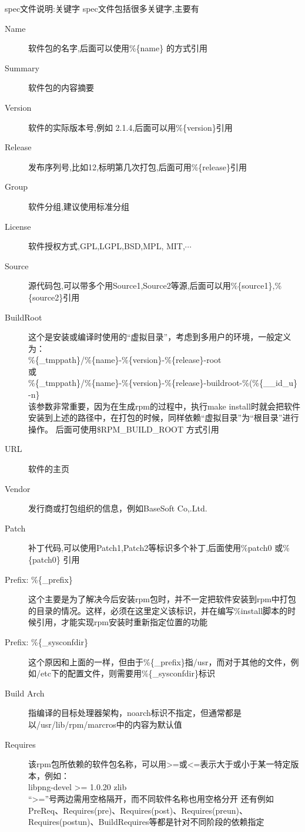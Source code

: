 \begin{frame}{spec文件说明:关键字}
spec文件包括很多关键字,主要有
\begin{description}
\item[Name] 软件包的名字,后面可以使用\%\{name\} 的方式引用
\item[Summary] 软件包的内容摘要
\item[Version] 软件的实际版本号,例如 2.1.4,后面可以用\%\{version\}引用
\item[Release] 发布序列号,比如12,标明第几次打包,后面可用\%\{release\}引用
\item[Group] 软件分组,建议使用标准分组
\item[License] 软件授权方式,GPL,LGPL,BSD,MPL, MIT,$\cdots$
\item[Source] 源代码包,可以带多个用Source1,Source2等源,后面可以用\%\{source1\},\%\{source2\}引用
\item[BuildRoot] 这个是安装或编译时使用的“虚拟目录”，考虑到多用户的环境，一般定义为：\\
\%\{\_tmppath\}/\%\{name\}-\%\{version\}-\%\{release\}-root \\
或 \\
\%\{\_tmppath\}/\%\{name\}-\%\{version\}-\%\{release\}-buildroot-\%(\%\{\_\_id\_u\} -n\} \\
该参数非常重要，因为在生成rpm的过程中，执行make install时就会把软件安装到上述的路径中，在打包的时候，同样依赖“虚拟目录”为“根目录”进行操作。
后面可使用\$RPM\_BUILD\_ROOT 方式引用
\item[URL] 软件的主页
\item[Vendor]发行商或打包组织的信息，例如BaseSoft Co,.Ltd.
\item[Patch] 补丁代码,可以使用Patch1,Patch2等标识多个补丁,后面使用\%patch0 或\%\{patch0\} 引用
\item[Prefix: \%\{\_prefix\}] 这个主要是为了解决今后安装rpm包时，并不一定把软件安装到rpm中打包的目录的情况。这样，必须在这里定义该标识，并在编写\%install脚本的时候引用，才能实现rpm安装时重新指定位置的功能
\item[Prefix: \%\{\_sysconfdir\}] 这个原因和上面的一样，但由于\%\{\_prefix\}指/usr，而对于其他的文件，例如/etc下的配置文件，则需要用\%\{\_sysconfdir\}标识
\item[Build Arch] 指编译的目标处理器架构，noarch标识不指定，但通常都是以/usr/lib/rpm/marcros中的内容为默认值

\item[Requires] 该rpm包所依赖的软件包名称，可以用>=或<=表示大于或小于某一特定版本，例如：\\
libpng-devel >= 1.0.20 zlib \\ 
“>=”号两边需用空格隔开，而不同软件名称也用空格分开
还有例如PreReq、Requires(pre)、Requires(post)、Requires(preun)、Requires(postun)、BuildRequires等都是针对不同阶段的依赖指定 


\end{description}
\end{frame}
